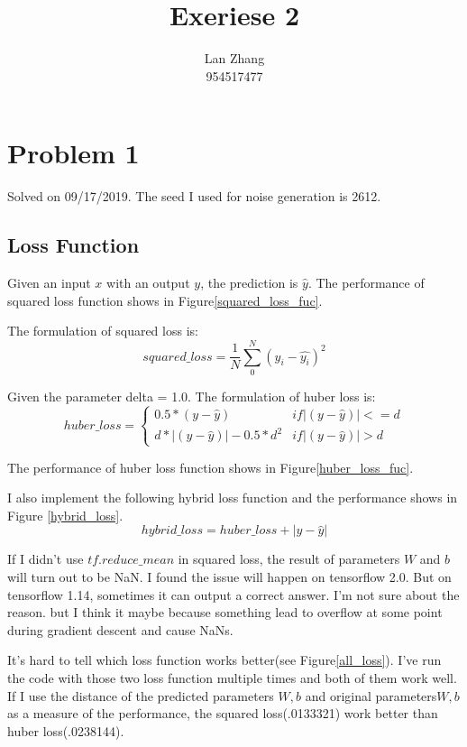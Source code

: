 \documentclass{article}
\title{Exeriese 2}
\author{%
  Lan Zhang\\
  954517477\\
}
\begin{document}
\maketitle

\section{Problem 1}

Solved on 09/17/2019. The seed I used for noise generation is 2612.

\subsection{Loss Function}

Given an input $x$ with an output $y$, the prediction is $\hat{y}$. The performance of squared loss function shows in Figure\ref{squared_loss_fuc}. 

The formulation of squared loss is:
$$squared\_loss = \frac{1}{N}\sum_0^N{(y_i - \hat{y_i})^2}$$

Given the parameter delta = 1.0. The formulation of huber loss is:
$$huber\_loss = \left\{\begin{matrix}
0.5 *  (y - \hat{y})          & if |(y - \hat{y})| <= d\\ 
d*|(y - \hat{y})| - 0.5 * d^2 & if |(y - \hat{y})| >  d
\end{matrix}\right.$$

The performance of huber loss function shows in Figure\ref{huber_loss_fuc}. 

I also implement the following hybrid loss function and the performance shows in Figure \ref{hybrid_loss}. 
$$hybrid\_loss = huber\_loss + |y - \hat{y}|$$

If I didn't use $tf.reduce\_mean$ in squared loss, the result of parameters $W$ and $b$ will turn out to be NaN. I found the issue will happen on tensorflow 2.0. But on tensorflow 1.14, sometimes it can output a correct answer. I'm not sure about the reason. but I think it maybe because something lead to overflow at some point during gradient descent and cause NaNs.

It's hard to tell which loss function works better(see Figure\ref{all_loss}). I've run the code with those two loss function multiple times and both of them work well. If I use the distance of the predicted parameters $W, b$ and original parameters$W, b$ as a measure of the performance, the squared loss(.0133321) work better than huber loss(.0238144).
\end{document}
